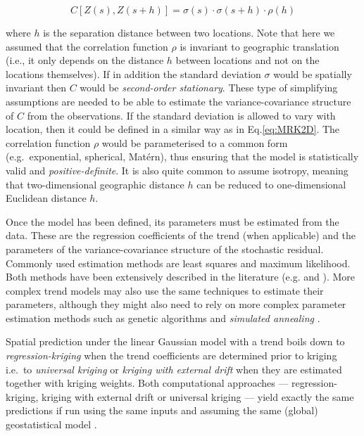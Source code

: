 \documentclass[graybox,natbib,nospthms,UStrade]{svmono}
\let\BeginKnitrBlock\begin \let\EndKnitrBlock\end
\let\BeginKnitrBlock\begin \let\EndKnitrBlock\end
\begin{document}
\begin{equation}
C\left[Z({s}),Z({s}+{h})\right] = \sigma (s) \cdot \sigma(s+{h}) \cdot \rho ({h})
\end{equation}

where \({{h}}\) is the separation distance between two locations. Note
that here we assumed that the correlation function \(\rho\) is invariant
to geographic translation (i.e., it only depends on the distance
\({h}\) between locations and not on the locations themselves). If in
addition the standard deviation \(\sigma\) would be spatially invariant
then \(C\) would be \emph{second-order stationary}. These type of simplifying
assumptions are needed to be able to estimate the variance-covariance
structure of \(C\) from the observations. If the standard deviation is
allowed to vary with location, then it could be defined in a similar way
as in Eq.\eqref{eq:MRK2D}. The correlation function \(\rho\) would be
parameterised to a common form (e.g.~exponential, spherical, Matérn),
thus ensuring that the model is statistically valid and
\emph{positive-definite}. It is also quite common to assume isotropy, meaning
that two-dimensional geographic distance \({{h}}\) can be reduced to
one-dimensional Euclidean distance \(h\).

Once the model has been defined, its parameters must be estimated from
the data. These are the regression coefficients of the trend (when
applicable) and the parameters of the variance-covariance structure of
the stochastic residual. Commonly used estimation methods are least
squares and maximum likelihood. Both methods have been extensively
described in the literature (e.g. \citet{Webster2001Wiley} and
\citet{Diggle2007Springer}). More complex trend models may also use the same
techniques to estimate their parameters, although they might also need
to rely on more complex parameter estimation methods such as genetic
algorithms and \emph{simulated annealing} \citep{lark2003fitting}.

\BeginKnitrBlock{rmdnote}
Spatial prediction under the linear Gaussian model with a trend boils
down to \emph{regression-kriging} when the trend coefficients are determined
prior to kriging i.e.~to \emph{universal kriging} or \emph{kriging with external drift} when they are estimated together with kriging weights. Both
computational approaches --- regression-kriging, kriging with external
drift or universal kriging --- yield exactly the same predictions if run
using the same inputs and assuming the same (global) geostatistical
model \citep{hengl2007regression}.
\EndKnitrBlock{rmdnote}
\end{document}
